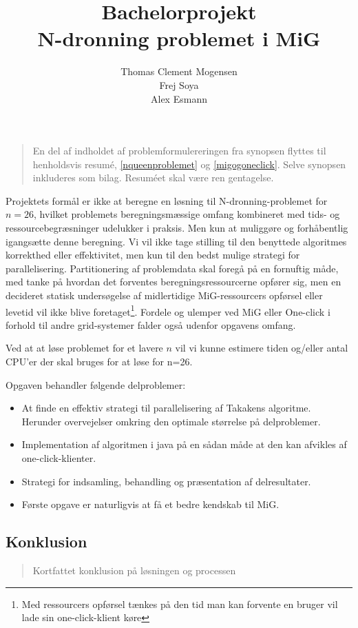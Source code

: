 \documentclass[draft,a4paper,10pt]{article}
\title{Bachelorprojekt\\N-dronning problemet i MiG}
\author{Thomas Clement Mogensen \\ Frej Soya \\ Alex Esmann }
\begin{document}
\maketitle
\tableofcontents

\newpage
\setcounter{page}{1}
\abstract
\begin{verse}
	En del af indholdet af problemformulereringen fra synopsen flyttes til henholdsvis resumé, \ref{nqueenproblemet} og \ref{migogoneclick}. Selve synopsen inkluderes som bilag. Resuméet skal være ren gentagelse.
\end{verse}
Projektets formål er ikke at beregne en løsning til N-dronning-problemet for $n=26$, hvilket problemets beregningsmæssige omfang kombineret med tids- og ressourcebegræsninger udelukker i praksis. Men kun at muliggøre og forhåbentlig igangsætte denne beregning.
Vi vil ikke tage stilling til den benyttede algoritmes korrekthed eller effektivitet, men kun til den bedst mulige strategi for parallelisering. Partitionering af problemdata skal foregå på en fornuftig måde, med tanke på hvordan det forventes beregningsressourcerne opfører sig, men en decideret statisk undersøgelse af midlertidige MiG-ressourcers opførsel eller levetid vil ikke blive foretaget\footnote{Med ressourcers opførsel tænkes på den tid man kan forvente en bruger vil lade sin one-click-klient køre}. Fordele og ulemper ved MiG eller One-click i forhold til andre grid-systemer falder også udenfor opgavens omfang.

Ved at at løse problemet for et lavere $n$ vil vi kunne estimere tiden og/eller antal CPU'er der skal bruges for at løse for n=26.

 Opgaven behandler følgende delproblemer:
\begin{itemize}
\item At finde en effektiv strategi til parallelisering af Takakens algoritme. Herunder overvejelser omkring den optimale størrelse på delproblemer.
\item Implementation af algoritmen i java på en sådan måde at den kan afvikles af one-click-klienter.
\item Strategi for indsamling, behandling og præsentation af delresultater.
\item Første opgave er naturligvis at få et bedre kendskab til MiG.
\end{itemize}


\subsection*{Konklusion}\label{konklusion}
\begin{verse}
	Kortfattet konklusion på løsningen og processen
\end{verse}
\end{document}
